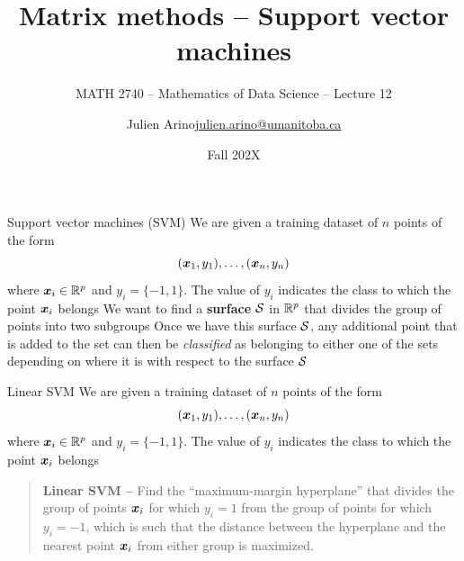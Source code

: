 \documentclass[aspectratio=169]{beamer}\usepackage[]{graphicx}\usepackage[]{xcolor}
\subtitle{MATH 2740 -- Mathematics of Data Science -- Lecture 12}
\author{\texorpdfstring{Julien Arino\newline\url{julien.arino@umanitoba.ca}}{Julien Arino}}
\institute{Department of Mathematics @ University of Manitoba}
\date{Fall 202X}
\title{Matrix methods -- Support vector machines}
\begin{document}
\setcounter{theorem}{87}







\begin{frame}{Support vector machines (SVM)}
    We are given a training dataset of $n$ points of the form
    \[ 
        (\bx_1, y_1), \ldots, (\bx_n, y_n)
    \]
    where $\bx_i\in\IR^p$ and $y_i=\{-1,1\}$. The value of $y_i$ indicates the class to which the point $\bx_i $ belongs
    \vfill
    We want to find a \textbf{surface} $\S$ in $\IR^p$ that divides the group of points into two subgroups
    \vfill
    Once we have this surface $\S$, any additional point that is added to the set can then be \emph{classified} as belonging to either one of the sets depending on where it is with respect to the surface $\S$
\end{frame}




\begin{frame}{Linear SVM}
    We are given a training dataset of $n$ points of the form
    \[ 
        (\bx_1, y_1), \ldots, (\bx_n, y_n)
    \]
    where $\bx_i\in\IR^p$ and $y_i=\{-1,1\}$. The value of $y_i$ indicates the class to which the point $\bx_i $ belongs
    \vfill
    \begin{quote}\textbf{Linear SVM --}
        Find the ``maximum-margin hyperplane'' that divides the group of points $\bx_i$ for which $y_i = 1$ from the group of points for which $y_i = -1$, which is such that the distance between the hyperplane and the nearest point $\bx_i$ from either group is maximized.
    \end{quote}
\end{frame}
\end{document}
